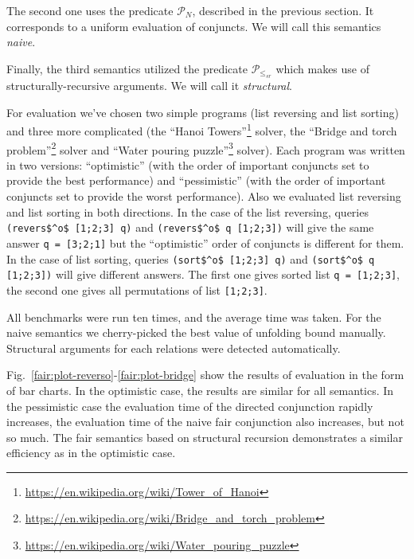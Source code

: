 The second one uses the predicate $\mathcal{P}_N$, described in the previous section. It corresponds to a uniform evaluation of conjuncts. We will call this semantics \emph{naive}.

Finally, the third semantics utilized the predicate $\mathcal{P}_{\leq_{sr}}$ which makes use of structurally-recursive arguments. We will call it \emph{structural}.

For evaluation we've chosen two simple programs (list reversing and list sorting) and three more complicated (the ``Hanoi Towers''\footnote{\url{https://en.wikipedia.org/wiki/Tower_of_Hanoi}} solver, the
``Bridge and torch problem''\footnote{\url{https://en.wikipedia.org/wiki/Bridge_and_torch_problem}} solver and ``Water pouring puzzle''\footnote{\url{https://en.wikipedia.org/wiki/Water_pouring_puzzle}} solver).
Each program was written in two versions: ``optimistic'' (with the order of important conjuncts set to provide the best performance) and ``pessimistic'' (with the order of important
conjuncts set to provide the worst performance). Also we evaluated list reversing and list sorting in both directions. In the case of the list reversing, queries \lstinline{(revers$^o$ [1;2;3] q)} and \lstinline{(revers$^o$ q [1;2;3])}\! will give the same answer \lstinline{q = [3;2;1]} but the ``optimistic'' order of conjuncts is different for them. In the case of list sorting, queries \lstinline{(sort$^o$ [1;2;3] q)} and \lstinline{(sort$^o$ q [1;2;3])} will give different answers. The first one gives sorted list \lstinline{q = [1;2;3]}, the second one gives all permutations of list \lstinline{[1;2;3]}\!\!. 

All benchmarks were run ten times, and the average time was taken. For the naive  semantics we cherry-picked the best value of unfolding bound manually. Structural arguments for each relations were detected automatically.

Fig.~\ref{fair:plot-reverso}-\ref{fair:plot-bridge} show the results of evaluation in the form of bar charts. In the optimistic case, the results are similar for all semantics.
In the pessimistic case the evaluation time of the directed conjunction rapidly increases, the evaluation time of the naive fair conjunction also increases, but not so much.
The fair semantics based on structural recursion demonstrates a similar efficiency as in the optimistic case.


